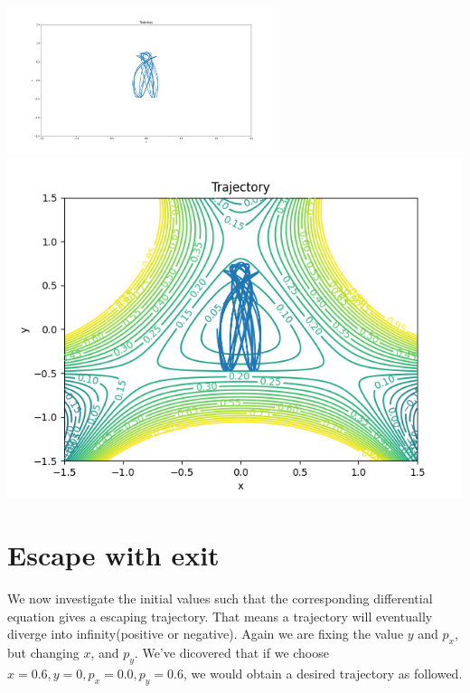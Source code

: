 \documentclass{article}
\begin{document}
	\includegraphics[scale=0.3, width=300]{./Trajectory2.png}
	\includegraphics[scale=0.5]{./Trajectory2_with_contour.png}

\section{Escape with exit}
	We now investigate the initial values such that the corresponding differential equation gives a escaping trajectory.
	That means a trajectory will eventually diverge into infinity(positive or negative). Again we are fixing the value $y$ and $p_x$, but changing $x$, and $p_y$.
	We've dicovered that if we choose $x = 0.6, y = 0, p_x = 0.0, p_y = 0.6$, we would obtain a desired trajectory as followed.
\end{document}
